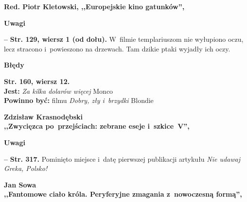 \documentclass[a4paper]{article}
\newcommand{\spaceOne}{2em}
\newcommand{\tb}{\textbf}
\newcommand{\noi}{\noindent}
\newcommand{\start}{\noi \tb{--} {}}
\newcommand{\Str}[1]{\tb{Str. #1.}}
\newcommand{\StrWg}[2]{\tb{Str. #1, wiersz #2.}}
\newcommand{\StrWd}[2]{\tb{Str. #1, wiersz #2 (od dołu).}}
\newcommand{\Center}[1]{\begin{center} #1 \end{center}}
\newcommand{\CenterTB}[1]{\Center{\tb{#1}}}
\newcommand{\Jest}{\tb{Jest: }}
\newcommand{\Pow}{\tb{Powinno być: }}
\newcommand{\Work}[1]{ \begin{center} {\large \tb{#1}} \end{center} }
\begin{document}
\vspace{\spaceOne}





\Work{
  Red. Piotr Kletowski,
  ,,Europejskie kino gatunków'', \cite{RedKletowski16}}


\CenterTB{Uwagi}

\start \StrWd{129}{1} W~filmie templariuszom nie wyłupiono oczu, lecz stracono i~powieszono na drzewach. Tam dzikie ptaki wyjadły ich oczy.

\CenterTB{Błędy}
\noi
\StrWg{160}{12} \\
\Jest \emph{Za kilka dolarów więcej} Monco \\
\Pow filmu \emph{Dobry, zły i~brzydki} Blondie \\

\vspace{\spaceOne}





\Work{
  Zdzisław Krasnodębski \\
  ,,Zwycięzca po~przejściach: zebrane eseje i~szkice~V'',
  \cite{Krasnodebski12} }


\CenterTB{Uwagi}

\start \Str{317} Pominięto miejsce i~datę pierwszej publikacji
artykułu \emph{Nie udawaj Greka, Polsko!}

\vspace{\spaceOne}





\Work{
  Jan Sowa \\
  ,,Fantomowe ciało króla. Peryferyjne zmagania z~nowoczesną formą'',
  \cite{Sowa11} }
\end{document}
